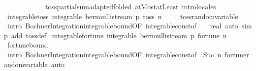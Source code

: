\begin{isabellebody}
\ \ \ \ \ \ \ \ \ \ \ \ toss{\isachardot}{\kern0pt}partial{\isacharunderscore}{\kern0pt}sum{\isacharunderscore}{\kern0pt}adapted{\isacharbrackleft}{\kern0pt}folded\ atMost{\isacharunderscore}{\kern0pt}atLeast{}{\isacharbrackright}{\kern0pt}{\isacharparenright}{\kern0pt}\ intro{\isacharunderscore}{\kern0pt}locales\isanewline
{}\isamarkupfalse%
%
\endisatagproof
{\isafoldproof}%
%
\isadelimproof
\isanewline
%
\endisadelimproof
\isanewline
{}\isamarkupfalse%
\ integrable{\isacharunderscore}{\kern0pt}toss{\isacharcolon}{\kern0pt}\ {\isachardoublequoteopen}integrable\ {\isacharparenleft}{\kern0pt}bernoulli{\isacharunderscore}{\kern0pt}stream\ p{\isacharparenright}{\kern0pt}\ {\isacharparenleft}{\kern0pt}toss\ n{\isacharparenright}{\kern0pt}{\isachardoublequoteclose}\ \isanewline
%
\isadelimproof
\ \ %
\endisadelimproof
%
\isatagproof
{}\isamarkupfalse%
\ toss{\isachardot}{\kern0pt}random{\isacharunderscore}{\kern0pt}variable\isanewline
\ \ \isamarkupfalse%
\ {\isacharparenleft}{\kern0pt}intro\ Bochner{\isacharunderscore}{\kern0pt}Integration{\isachardot}{\kern0pt}integrable{\isacharunderscore}{\kern0pt}bound{\isacharbrackleft}{\kern0pt}OF\ integrable{\isacharunderscore}{\kern0pt}const{\isacharbrackleft}{\kern0pt}of\ {\isacharunderscore}{\kern0pt}\ {\isachardoublequoteopen}{}\ {\isacharcolon}{\kern0pt}{\isacharcolon}{\kern0pt}\ real{\isachardoublequoteclose}{\isacharbrackright}{\kern0pt}{\isacharbrackright}{\kern0pt}{\isacharparenright}{\kern0pt}\ {\isacharparenleft}{\kern0pt}auto\ simp\ add{\isacharcolon}{\kern0pt}\ toss{\isacharunderscore}{\kern0pt}def{\isacharparenright}{\kern0pt}%
\endisatagproof
{\isafoldproof}%
%
\isadelimproof
\isanewline
%
\endisadelimproof
\isanewline
{}\isamarkupfalse%
\ integrable{\isacharunderscore}{\kern0pt}fortune{\isacharcolon}{\kern0pt}\ {\isachardoublequoteopen}integrable\ {\isacharparenleft}{\kern0pt}bernoulli{\isacharunderscore}{\kern0pt}stream\ p{\isacharparenright}{\kern0pt}\ {\isacharparenleft}{\kern0pt}fortune\ n{\isacharparenright}{\kern0pt}{\isachardoublequoteclose}%
\isadelimproof
\ %
\endisadelimproof
%
\isatagproof
{}\isamarkupfalse%
\ fortune{\isacharunderscore}{\kern0pt}bound\ \isanewline
\ \ \isamarkupfalse%
\ {\isacharparenleft}{\kern0pt}intro\ Bochner{\isacharunderscore}{\kern0pt}Integration{\isachardot}{\kern0pt}integrable{\isacharunderscore}{\kern0pt}bound{\isacharbrackleft}{\kern0pt}OF\ integrable{\isacharunderscore}{\kern0pt}const{\isacharbrackleft}{\kern0pt}of\ {\isacharunderscore}{\kern0pt}\ {\isachardoublequoteopen}Suc\ n{\isachardoublequoteclose}{\isacharbrackright}{\kern0pt}\ fortune{\isachardot}{\kern0pt}random{\isacharunderscore}{\kern0pt}variable{\isacharbrackright}{\kern0pt}{\isacharparenright}{\kern0pt}\ auto%

\end{isabellebody}
